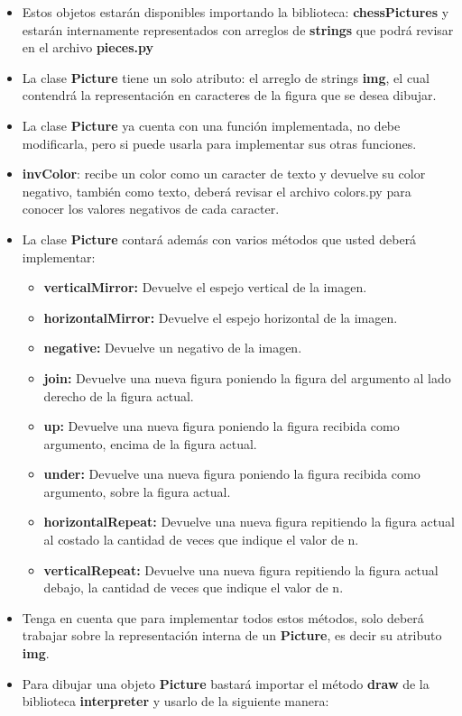 \documentclass{article}
\begin{document}
	\begin{itemize}
		\item Estos objetos estarán disponibles importando la biblioteca: \textbf{chessPictures} y estarán internamente representados con arreglos de \textbf{strings} que podrá revisar en el archivo \textbf{pieces.py}
		\item La clase \textbf{Picture} tiene un solo atributo: el arreglo de strings \textbf{img}, el cual contendrá la representación en caracteres de la figura que se desea dibujar.
		\item La clase \textbf{Picture} ya cuenta con una función implementada, no debe modificarla, pero si puede usarla para implementar sus otras funciones.
		\item \textbf{invColor}: recibe un color como un caracter de texto y devuelve su color negativo, también como texto, deberá revisar el archivo colors.py para conocer los valores negativos de cada caracter.
		\item La clase \textbf{Picture} contará además con varios métodos que usted deberá implementar:
		\begin{itemize}
		\item \textbf{verticalMirror:} Devuelve el espejo vertical de la imagen.
		\item \textbf{horizontalMirror:} Devuelve el espejo horizontal de la imagen.
  		\item \textbf{negative:} Devuelve un negativo de la imagen.
  		\item \textbf{join:} Devuelve una nueva figura poniendo la figura del argumento al lado derecho de la figura actual.
		\item \textbf{up:} Devuelve una nueva figura poniendo la figura recibida como argumento, encima de la figura actual.
		\item \textbf{under:} Devuelve una nueva figura poniendo la figura recibida como argumento, sobre la figura actual.
		\item \textbf{horizontalRepeat:} Devuelve una nueva figura repitiendo la figura actual al costado la cantidad de veces que indique el valor de n.
		\item \textbf{verticalRepeat:} Devuelve una nueva figura repitiendo la figura actual debajo, la cantidad de veces que indique el valor de n.
		\end{itemize}
		\item Tenga en cuenta que para implementar todos estos métodos, solo deberá trabajar sobre la representación interna de un    \textbf{Picture}, es decir su atributo \textbf{img}.
		\item Para dibujar una objeto \textbf{Picture} bastará importar el método \textbf{draw} de la biblioteca \textbf{interpreter} y usarlo de la siguiente manera:
	\end{itemize}
\end{document}

